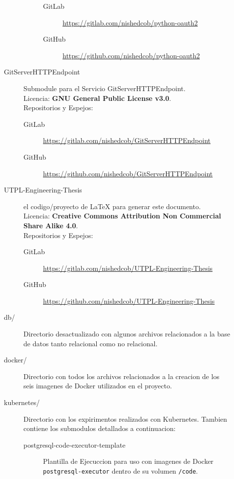 \begin{description}
\begin{description}
\begin{description}
\begin{description}
                \item[GitLab] \sloppy \url{https://gitlab.com/nishedcob/python-oauth2}
                \item[GitHub] \sloppy \url{https://github.com/nishedcob/python-oauth2}
            \end{description}
        \end{description}
        \item[GitServerHTTPEndpoint] Submodule para el Servicio GitServerHTTPEndpoint. \\
        Licencia: \textbf{GNU General Public License v3.0}. \\
        Repositorios y Espejos:
        \begin{description}
        	\item[GitLab] \sloppy \url{https://gitlab.com/nishedcob/GitServerHTTPEndpoint}
            \item[GitHub] \sloppy \url{https://github.com/nishedcob/GitServerHTTPEndpoint}
        \end{description}
        \item[UTPL-Engineering-Thesis] el codigo/proyecto de LaTeX para generar este documento. \\
        Licencia: \textbf{Creative Commons Attribution Non Commercial Share Alike 4.0}. \\
        Repositorios y Espejos:
        \begin{description}
        	\item[GitLab] \sloppy \url{https://gitlab.com/nishedcob/UTPL-Engineering-Thesis}
            \item[GitHub] \sloppy \url{https://github.com/nishedcob/UTPL-Engineering-Thesis}
        \end{description}
        \item[db/] Directorio desactualizado con algunos archivos relacionados a la base de datos tanto relacional como no relacional.
        \item[docker/] Directorio con todos los archivos relacionados a la creacion de los seis imagenes de Docker utilizados en el proyecto.
        \item[kubernetes/] Directorio con los expirimentos realizados con Kubernetes. Tambien contiene los submodulos detallados a continuacion:
        \begin{description}
        	\item[postgresql-code-executor-template] Plantilla de Ejecuccion para uso con imagenes de Docker \texttt{postgresql-executor} dentro de su volumen \texttt{/code}.\\

\end{description}
\end{description}
\end{description}
